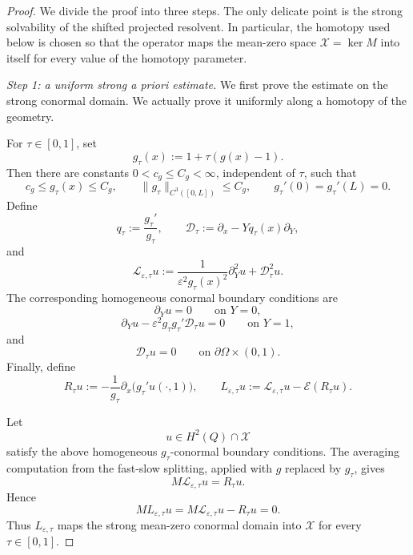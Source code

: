 \documentclass[11pt]{article}
\theoremstyle{definition}
\theoremstyle{remark}
\numberwithin{equation}{section}
\begin{document}
\begin{proof}
We divide the proof into three steps. The only delicate point is the
strong solvability of the shifted projected resolvent. In particular, the
homotopy used below is chosen so that the operator maps the mean-zero space
\(\mathcal X=\ker M\) into itself for every value of the homotopy parameter.

\emph{Step 1: a uniform strong a priori estimate.}
We first prove the estimate on the strong conormal domain. We actually prove
it uniformly along a homotopy of the geometry.

For \(\tau\in[0,1]\), set
\[
g_\tau(x):=1+\tau(g(x)-1).
\]
Then there are constants \(0<c_g\le C_g<\infty\), independent of \(\tau\), such that
\[
c_g\le g_\tau(x)\le C_g,\qquad
\|g_\tau\|_{C^3([0,L])}\le C_g,\qquad
g_\tau'(0)=g_\tau'(L)=0 .
\] 
Define
\[
q_\tau:=\frac{g_\tau'}{g_\tau},
\qquad
\mathcal D_\tau:=\partial_x-Yq_\tau(x)\partial_Y,
\]
and
\[
\mathscr L_{\varepsilon,\tau}u
:=
\frac1{\varepsilon^2g_\tau(x)^2}\partial_Y^2u
+
\mathcal D_\tau^2u.
\]
The corresponding homogeneous conormal boundary conditions are
\[
\partial_Yu=0
\qquad\text{on }Y=0,
\]
\[
\partial_Yu-\varepsilon^2g_\tau g_\tau'\mathcal D_\tau u=0
\qquad\text{on }Y=1,
\]
and
\[
\mathcal D_\tau u=0
\qquad\text{on }\partial\Omega\times(0,1).
\]
Finally, define
\[
R_\tau u:=
-\frac1{g_\tau}\partial_x\bigl(g_\tau' u(\cdot,1)\bigr),
\qquad
L_{\varepsilon,\tau}u
:=
\mathscr L_{\varepsilon,\tau}u-\mathcal E(R_\tau u).
\]

Let
\[
u\in H^2(Q)\cap\mathcal X
\]
satisfy the above homogeneous \(g_\tau\)-conormal boundary conditions. The
averaging computation from the fast-slow splitting, applied with \(g\)
replaced by \(g_\tau\), gives
\[
M\mathscr L_{\varepsilon,\tau}u=R_\tau u.
\]
Hence
\[
M L_{\varepsilon,\tau}u
=
M\mathscr L_{\varepsilon,\tau}u-R_\tau u
=
0.
\]
Thus \(L_{\varepsilon,\tau}\) maps the strong mean-zero conormal domain into
\(\mathcal X\) for every \(\tau\in[0,1]\).


\end{proof}
\end{document}
